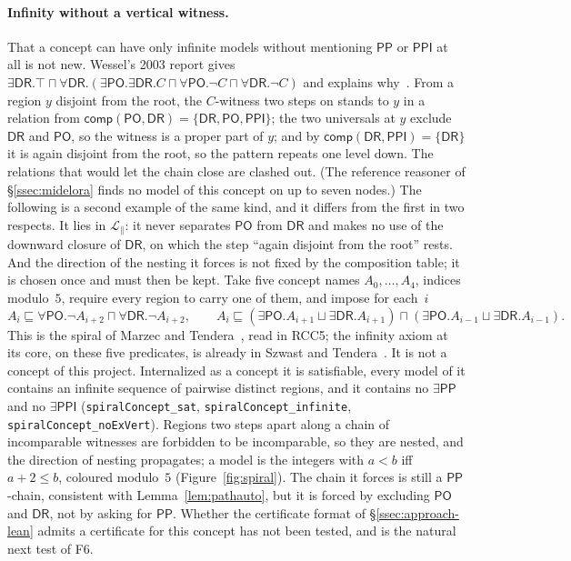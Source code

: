 \documentclass[11pt]{article}
\newcommand{\DR}{\mathsf{DR}}
\newcommand{\PO}{\mathsf{PO}}
\newcommand{\PP}{\mathsf{PP}}
\newcommand{\PPI}{\mathsf{PPI}}
\newcommand{\code}[1]{\texttt{#1}}
\newcommand{\comp}{\ensuremath{\mathsf{comp}}}
\theoremstyle{plain}
\theoremstyle{definition}
\begin{document}
\paragraph{Infinity without a vertical witness.} That a concept can have only
infinite models without mentioning $\PP$ or $\PPI$ at all is not new. Wessel's
2003 report gives
$\exists\DR.\top\sqcap\forall\DR.(\exists\PO.\exists\DR.C\sqcap
\forall\PO.\neg C\sqcap\forall\DR.\neg C)$ and explains
why~\cite[\S5.2, Fig.~12]{Wessel2003}. From a region $y$ disjoint from the
root, the $C$-witness two steps on stands to $y$ in a relation from
$\comp(\PO,\DR)=\{\DR,\PO,\PPI\}$; the two universals at $y$ exclude $\DR$ and
$\PO$, so the witness is a proper part of $y$; and by
$\comp(\DR,\PPI)=\{\DR\}$ it is again disjoint from the root, so the pattern
repeats one level down. The relations that would let the chain close are
clashed out. (The reference reasoner of \S\ref{ssec:midelora} finds no model
of this concept on up to seven nodes.) The following is a second example of
the same kind, and it differs from the first in two respects. It lies in
$\mathcal L_{\parallel}$: it never separates $\PO$ from $\DR$ and makes no use
of the downward closure of $\DR$, on which the step ``again disjoint from the
root'' rests. And the direction of the nesting it forces is not fixed by the
composition table; it is chosen once and must then be kept. Take five concept
names $A_0,\dots,A_4$, indices modulo~$5$, require
every region to carry one of them, and impose for each~$i$
\[
A_i\sqsubseteq\forall\PO.\neg A_{i+2}\sqcap\forall\DR.\neg A_{i+2},
\qquad
A_i\sqsubseteq(\exists\PO.A_{i+1}\sqcup\exists\DR.A_{i+1})\sqcap
(\exists\PO.A_{i-1}\sqcup\exists\DR.A_{i-1}).
\]
This is the spiral of Marzec and Tendera~\cite{MarzecTendera2026}, read in
RCC5; the infinity axiom at its core, on these five predicates, is already in
Szwast and Tendera~\cite[\S5]{SzwastTendera2018}. It is not a concept of this
project. Internalized as a concept it is satisfiable, every model of it contains
an infinite sequence of pairwise distinct regions, and it contains no
$\exists\PP$ and no $\exists\PPI$ (\code{spiralConcept\_sat},
\code{spiralConcept\_infinite}, \code{spiralConcept\_noExVert}). Regions two
steps apart along a chain of incomparable witnesses are forbidden to be
incomparable, so they are nested, and the direction of nesting propagates; a
model is the integers with $a<b$ iff $a+2\le b$, coloured modulo~$5$
(Figure~\ref{fig:spiral}). The
chain it forces is still a $\PP$-chain, consistent with
Lemma~\ref{lem:pathauto}, but it is forced by excluding $\PO$ and $\DR$, not
by asking for $\PP$. Whether the
certificate format of \S\ref{ssec:approach-lean} admits a certificate for this
concept has not been tested, and is the natural next test of F6.
\end{document}
